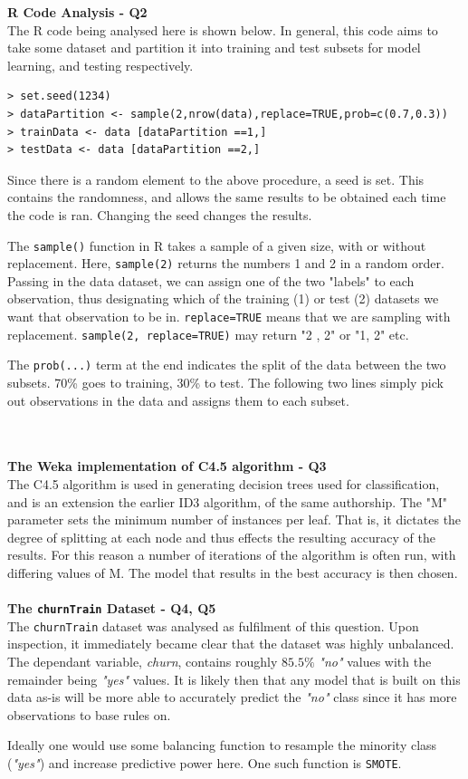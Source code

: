 \documentclass[paper=a4, fontsize=11pt]{scrartcl} %
\begin{document}
{\noindent \bf \Large R Code Analysis - Q2}\\
{The R code being analysed here is shown below. In general, this code aims to take some dataset and partition it into training and test subsets for model learning, and testing respectively. }
\begin{lstlisting}
> set.seed(1234)
> dataPartition <- sample(2,nrow(data),replace=TRUE,prob=c(0.7,0.3)) 
> trainData <- data [dataPartition ==1,]
> testData <- data [dataPartition ==2,]
\end{lstlisting}
{\par{ Since there is a random element to the above procedure, a seed is set. This contains the randomness, and allows the same results to be obtained each time the code is ran. Changing the seed changes the results.}
\par{The \texttt{sample()} function in R takes a sample of a given size, with or without replacement. Here, \texttt{sample(2)} returns the numbers 1 and 2 in a random order. Passing in the data dataset, we can assign one of the two "labels" to each observation, thus designating which of the training (1) or test (2) datasets we want that observation to be in. \texttt{replace=TRUE} means that we are sampling with replacement. \texttt{sample(2, replace=TRUE)} may return "2 , 2" or "1, 2" etc. 
\par{
The \texttt{prob(...)} term at the end indicates the split of the data between the two subsets. 70\% goes to training, 30\% to test.} The following two lines simply pick out observations in the data and assigns them to each subset. }
}\\\\
{\noindent \bf \Large The Weka implementation of C4.5 algorithm - Q3}\\
{The C4.5 algorithm is used in generating decision trees used for classification, and is an extension the earlier ID3 algorithm, of the same authorship. The "M" parameter sets the minimum number of instances per leaf. That is, it dictates the degree of splitting at each node and thus effects the resulting accuracy of the results. For this reason a number of iterations of the algorithm is often run, with differing values of M. The model that results in the best accuracy is then chosen.}\\\\
{\noindent \bf \Large The \texttt{churnTrain} Dataset - Q4, Q5}\\
{The \texttt{churnTrain} dataset was analysed as fulfilment of this question. Upon inspection, it immediately became clear that the dataset was highly unbalanced. The dependant variable, {\it churn}, contains roughly $85.5\%$ {\it "no"} values with the remainder being {\it "yes"} values. It is likely then that any model that is built on this data as-is will be more able to accurately predict the {\it "no"} class since it has more observations to base rules on.} \par{Ideally one would use some balancing function to resample the minority class ({\it "yes"}) and increase predictive power here. One such function is \texttt{SMOTE}.}
\end{document}
